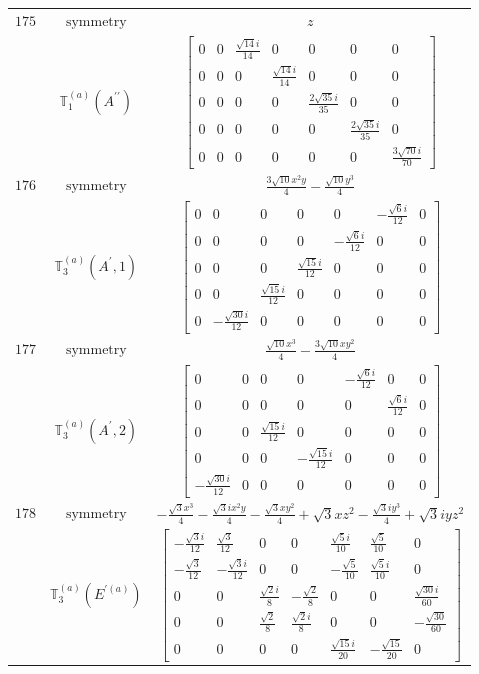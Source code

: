 \documentclass[fleqn,8pt,landscape]{jsarticle}
\begin{document}
\begin{longtable}{ccc}
$ 175 $ & $ \text{symmetry} $ & $ z $ \\
$  $ & $ \mathbb{T}_{1}^{(a)}(A^{\prime\prime}) $ & $ \begin{bmatrix} 0 & 0 & \frac{\sqrt{14} i}{14} & 0 & 0 & 0 & 0 \\ 0 & 0 & 0 & \frac{\sqrt{14} i}{14} & 0 & 0 & 0 \\ 0 & 0 & 0 & 0 & \frac{2 \sqrt{35} i}{35} & 0 & 0 \\ 0 & 0 & 0 & 0 & 0 & \frac{2 \sqrt{35} i}{35} & 0 \\ 0 & 0 & 0 & 0 & 0 & 0 & \frac{3 \sqrt{70} i}{70} \end{bmatrix} $ \\ \hline
$ 176 $ & $ \text{symmetry} $ & $ \frac{3 \sqrt{10} x^{2} y}{4} - \frac{\sqrt{10} y^{3}}{4} $ \\
$  $ & $ \mathbb{T}_{3}^{(a)}(A^{\prime},1) $ & $ \begin{bmatrix} 0 & 0 & 0 & 0 & 0 & - \frac{\sqrt{6} i}{12} & 0 \\ 0 & 0 & 0 & 0 & - \frac{\sqrt{6} i}{12} & 0 & 0 \\ 0 & 0 & 0 & \frac{\sqrt{15} i}{12} & 0 & 0 & 0 \\ 0 & 0 & \frac{\sqrt{15} i}{12} & 0 & 0 & 0 & 0 \\ 0 & - \frac{\sqrt{30} i}{12} & 0 & 0 & 0 & 0 & 0 \end{bmatrix} $ \\ \hline
$ 177 $ & $ \text{symmetry} $ & $ \frac{\sqrt{10} x^{3}}{4} - \frac{3 \sqrt{10} x y^{2}}{4} $ \\
$  $ & $ \mathbb{T}_{3}^{(a)}(A^{\prime},2) $ & $ \begin{bmatrix} 0 & 0 & 0 & 0 & - \frac{\sqrt{6} i}{12} & 0 & 0 \\ 0 & 0 & 0 & 0 & 0 & \frac{\sqrt{6} i}{12} & 0 \\ 0 & 0 & \frac{\sqrt{15} i}{12} & 0 & 0 & 0 & 0 \\ 0 & 0 & 0 & - \frac{\sqrt{15} i}{12} & 0 & 0 & 0 \\ - \frac{\sqrt{30} i}{12} & 0 & 0 & 0 & 0 & 0 & 0 \end{bmatrix} $ \\ \hline
$ 178 $ & $ \text{symmetry} $ & $ - \frac{\sqrt{3} x^{3}}{4} - \frac{\sqrt{3} i x^{2} y}{4} - \frac{\sqrt{3} x y^{2}}{4} + \sqrt{3} x z^{2} - \frac{\sqrt{3} i y^{3}}{4} + \sqrt{3} i y z^{2} $ \\
$  $ & $ \mathbb{T}_{3}^{(a)}(E^{\prime(a)}) $ & $ \begin{bmatrix} - \frac{\sqrt{3} i}{12} & \frac{\sqrt{3}}{12} & 0 & 0 & \frac{\sqrt{5} i}{10} & \frac{\sqrt{5}}{10} & 0 \\ - \frac{\sqrt{3}}{12} & - \frac{\sqrt{3} i}{12} & 0 & 0 & - \frac{\sqrt{5}}{10} & \frac{\sqrt{5} i}{10} & 0 \\ 0 & 0 & \frac{\sqrt{2} i}{8} & - \frac{\sqrt{2}}{8} & 0 & 0 & \frac{\sqrt{30} i}{60} \\ 0 & 0 & \frac{\sqrt{2}}{8} & \frac{\sqrt{2} i}{8} & 0 & 0 & - \frac{\sqrt{30}}{60} \\ 0 & 0 & 0 & 0 & \frac{\sqrt{15} i}{20} & - \frac{\sqrt{15}}{20} & 0 \end{bmatrix} $ \\ \hline

\end{longtable}
\end{document}
